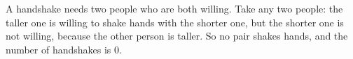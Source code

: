 A handshake needs two people who are both willing. Take any two people: the taller one is willing to shake hands with the shorter one, but the shorter one is not willing, because the other person is taller. So no pair shakes hands, and the number of handshakes is $\boxed{0}$.
